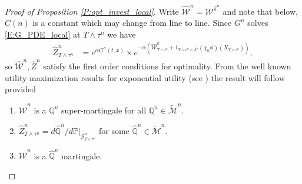 \documentclass[11pt, letterpaper]{amsart}
\theoremstyle{definition}
\theoremstyle{remark}
\numberwithin{equation}{section}
\newcommand{\We}{\mathcal{W}}
\newcommand{\hwe}{\hat{\We}}
\newcommand{\hz}{\hat{Z}}
\newcommand{\hqprob}{\hat{\qprob}}
\newcommand{\hpi}{\hat{\pi}}
\newcommand{\prob}{\mathbb{P}}
\newcommand{\qprob}{\mathbb{Q}}
\newcommand{\G}{\mathcal{G}}
\newcommand{\tM}{\widetilde{\mathcal{M}}}
\begin{document}
\begin{proof}[Proof of Proposition \ref{P:opt_invest_local}]
Write $\hwe^n = \We^{\hpi^n}$ and note that below, $C(n)$ is a constant which may change from line to line. Since $G^n$ solves \eqref{E:G_PDE_local}  at $T\wedge\tau^n$ we have
\begin{equation*}
\begin{split}
\hz^n_{T\wedge\tau^n} &= e^{\alpha G^n(t,x)} \times e^{-\alpha\left(\hwe^n_{T\wedge\tau^n} + 1_{T\wedge\tau^n< \delta^n}(\chi_n\phi)(X_{T\wedge\tau^n})\right)},
\end{split}
\end{equation*}
so $\hwe^n, \hz^n$ satisfy the first order conditions for optimality. From the well known utility maximization results for exponential utility (see \cite{MR1891730,MR1891731,MR1743972,MR1920099}) the result will follow provided
\begin{enumerate}[(1)]
\item $\hwe^n$ is a $\qprob^n$ super-martingale for all $\qprob^n\in\tM^n$.
\item $\hz^n_{T\wedge\tau^n} = d\hqprob^n/d\prob \big|_{\G^n_{T\wedge\tau^n}}$ for some $\hqprob^n \in \tM^n$.
\item $\hwe^n$ is a $\hqprob^n$ martingale.
\end{enumerate}


\end{proof}
\end{document}
